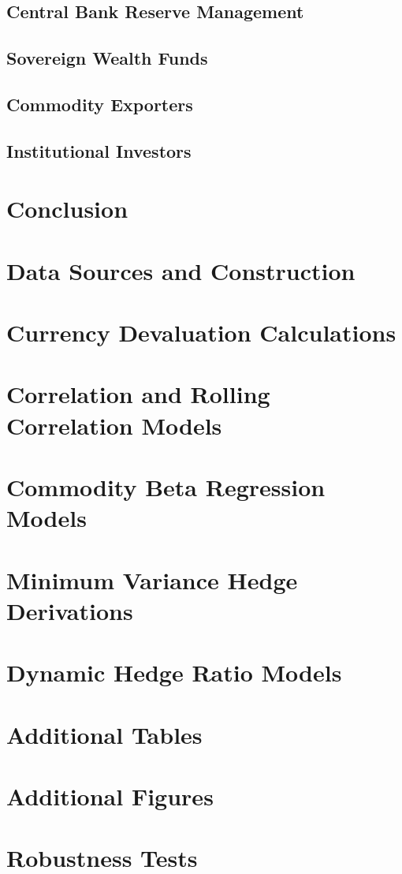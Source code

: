 \documentclass{article}
\begin{document}
\subsection{Central Bank Reserve Management}

\subsection{Sovereign Wealth Funds}

\subsection{Commodity Exporters}

\subsection{Institutional Investors}

\section{Conclusion}

\newpage

\appendix

\section{Data Sources and Construction}

\section{Currency Devaluation Calculations}

\section{Correlation and Rolling Correlation Models}

\section{Commodity Beta Regression Models}

\section{Minimum Variance Hedge Derivations}

\section{Dynamic Hedge Ratio Models}

\section{Additional Tables}

\section{Additional Figures}

\section{Robustness Tests}

\newpage





\end{document}
